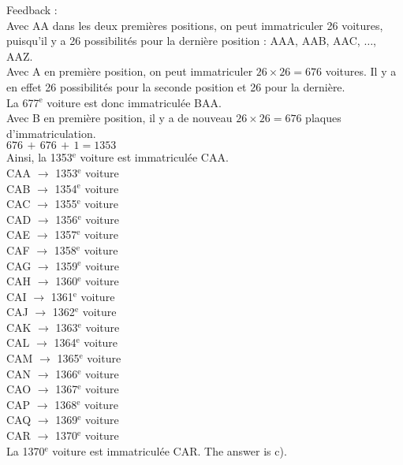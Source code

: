 ﻿\documentclass[letterpaper, 12pt]{article}
\begin{document}
Feedback : \\
Avec AA dans les deux premi\`eres positions, on peut immatriculer 26
voitures, puisqu'il y a 26 possibilit\'es pour la derni\`ere position : AAA,
AAB, AAC, $\ldots$, AAZ.\\
Avec A en premi\`ere position, on peut immatriculer $26\times26=676$
voitures. Il y a en effet 26 possibilit\'es pour la seconde position et 26
pour la derni\`ere.  \\
La 677$^{\textrm{e}}$ voiture est donc immatricul\'ee BAA.\\
Avec B en premi\`ere position, il y a de nouveau $26\times26=676$ plaques
d'immatriculation.\\
$676\,+\,676\,+\,1=1353$\\
Ainsi, la 1353$^{\textrm{e}}$ voiture est immatricul\'ee CAA.\\
CAA $\longrightarrow$ 1353$^{\textrm{e}}$ voiture\\
CAB $\longrightarrow$ 1354$^{\textrm{e}}$ voiture\\
CAC $\longrightarrow$ 1355$^{\textrm{e}}$ voiture\\
CAD $\longrightarrow$ 1356$^{\textrm{e}}$ voiture\\
CAE $\longrightarrow$ 1357$^{\textrm{e}}$ voiture\\
CAF $\longrightarrow$ 1358$^{\textrm{e}}$ voiture\\
CAG $\longrightarrow$ 1359$^{\textrm{e}}$ voiture\\
CAH $\longrightarrow$ 1360$^{\textrm{e}}$ voiture \\
CAI $\longrightarrow$ 1361$^{\textrm{e}}$ voiture\\
CAJ $\longrightarrow$ 1362$^{\textrm{e}}$ voiture\\
CAK $\longrightarrow$ 1363$^{\textrm{e}}$ voiture\\
CAL $\longrightarrow$ 1364$^{\textrm{e}}$ voiture\\
CAM $\longrightarrow$ 1365$^{\textrm{e}}$ voiture\\
CAN $\longrightarrow$ 1366$^{\textrm{e}}$ voiture\\
CAO $\longrightarrow$ 1367$^{\textrm{e}}$ voiture\\
CAP $\longrightarrow$ 1368$^{\textrm{e}}$ voiture\\
CAQ $\longrightarrow$ 1369$^{\textrm{e}}$ voiture\\
CAR $\longrightarrow$ 1370$^{\textrm{e}}$ voiture\\
La 1370$^{\textrm{e}}$ voiture est immatricul\'ee CAR. The answer is
c).\\
\end{document}
